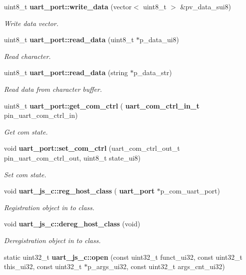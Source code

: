 \begin{DoxyCompactItemize}
uint8\+\_\+t \textbf{ uart\+\_\+port\+::write\+\_\+data} (vector$<$ uint8\+\_\+t $>$ \&pv\+\_\+data\+\_\+sui8)
\begin{DoxyCompactList}\small\item\em Write data vector. \end{DoxyCompactList}\item 
uint8\+\_\+t \textbf{ uart\+\_\+port\+::read\+\_\+data} (uint8\+\_\+t $\ast$p\+\_\+data\+\_\+ui8)
\begin{DoxyCompactList}\small\item\em Read character. \end{DoxyCompactList}\item 
uint8\+\_\+t \textbf{ uart\+\_\+port\+::read\+\_\+data} (string $\ast$p\+\_\+data\+\_\+str)
\begin{DoxyCompactList}\small\item\em Read data from character buffer. \end{DoxyCompactList}\item 
uint8\+\_\+t \textbf{ uart\+\_\+port\+::get\+\_\+com\+\_\+ctrl} (\textbf{ uart\+\_\+com\+\_\+ctrl\+\_\+in\+\_\+t} pin\+\_\+uart\+\_\+com\+\_\+ctrl\+\_\+in)
\begin{DoxyCompactList}\small\item\em Get com state. \end{DoxyCompactList}\item 
void \textbf{ uart\+\_\+port\+::set\+\_\+com\+\_\+ctrl} (uart\+\_\+com\+\_\+ctrl\+\_\+out\+\_\+t pin\+\_\+uart\+\_\+com\+\_\+ctrl\+\_\+out, uint8\+\_\+t state\+\_\+ui8)
\begin{DoxyCompactList}\small\item\em Set com state. \end{DoxyCompactList}\item 
void \textbf{ uart\+\_\+js\+\_\+c\+::reg\+\_\+host\+\_\+class} (\textbf{ uart\+\_\+port} $\ast$p\+\_\+com\+\_\+uart\+\_\+port)
\begin{DoxyCompactList}\small\item\em Registration object in to class. \end{DoxyCompactList}\item 
void \textbf{ uart\+\_\+js\+\_\+c\+::dereg\+\_\+host\+\_\+class} (void)
\begin{DoxyCompactList}\small\item\em Deregistration object in to class. \end{DoxyCompactList}\item 
static uint32\+\_\+t \textbf{ uart\+\_\+js\+\_\+c\+::open} (const uint32\+\_\+t funct\+\_\+ui32, const uint32\+\_\+t this\+\_\+ui32, const uint32\+\_\+t $\ast$p\+\_\+args\+\_\+ui32, const uint32\+\_\+t args\+\_\+cnt\+\_\+ui32)

\end{DoxyCompactItemize}
